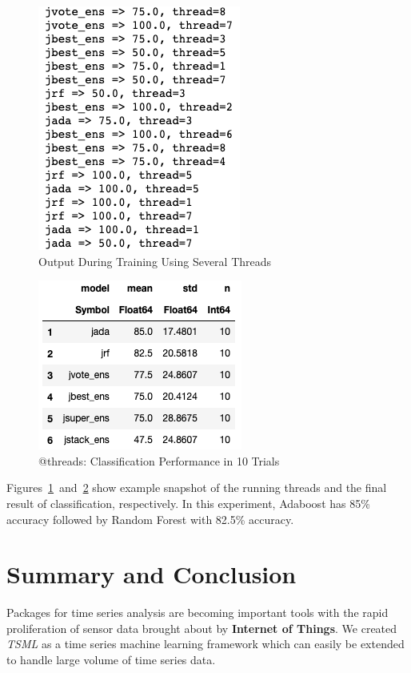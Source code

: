 \documentclass{juliacon}
\begin{document}
\begin{figure}[htbp]
   \centering
   \includegraphics[width=0.5\columnwidth]{threadrunning.png} %
   \caption{Output During Training Using Several Threads}
   \label{fig:threadrunning}
\end{figure}

\begin{figure}[htbp]
   \centering
   \includegraphics[width=0.5\columnwidth]{threadresult.png} %
   \caption{@threads: Classification Performance in 10 Trials}
   \label{fig:threadresult}
\end{figure}

Figures~\ref{fig:threadrunning}~and~\ref{fig:threadresult} show example snapshot of the running threads and the final result of classification, respectively. In this experiment, Adaboost has 85\% accuracy followed by Random Forest with 82.5\% accuracy.

\section{Summary and Conclusion}
Packages for time series analysis are becoming important tools with the rapid proliferation of sensor data brought about by \textbf{Internet of Things}.  We created \emph{TSML} as a time series machine learning framework which can easily be extended to handle large volume of time series data. 
\end{document}

